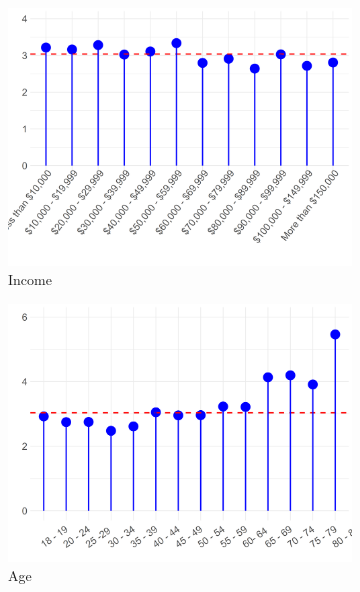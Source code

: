 \documentclass[12pt]{article}
\begin{document}
\begin{figure}[ht!]
\begin{subfigure}[b]{0.3\textwidth}
        \includegraphics[width=1.0\textwidth]{Plots/uni-dist-grd-int-inc.png}
            \caption{Income}
            \label{fig:grd-int-inc}
    \end{subfigure}
     \begin{subfigure}[b]{0.3\textwidth}
        \includegraphics[width=1.0\textwidth]{Plots/uni-dist-grd-int-age.png}
            \caption{Age}
            \label{fig:grd-int-age}
    \end{subfigure}
     \begin{subfigure}[b]{0.3\textwidth}

\end{subfigure}
\end{figure}
\end{document}
